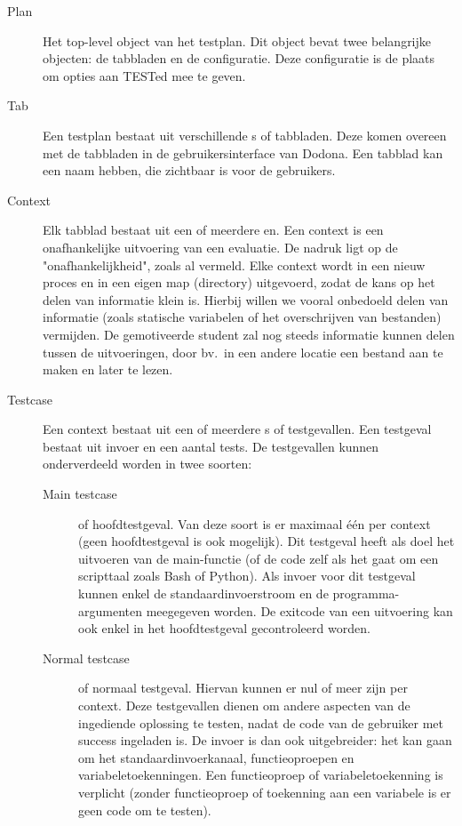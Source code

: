 \begin{description}
    \item[Plan] Het top-level object van het testplan.
    Dit object bevat twee belangrijke objecten: de tabbladen en de configuratie.
    Deze configuratie is de plaats om opties aan TESTed mee te geven.
    \item[Tab] Een testplan bestaat uit verschillende s of tabbladen.
    Deze komen overeen met de tabbladen in de gebruikersinterface van Dodona.
    Een tabblad kan een naam hebben, die zichtbaar is voor de gebruikers.
    \item[Context] Elk tabblad bestaat uit een of meerdere en.
    Een context is een onafhankelijke uitvoering van een evaluatie.
    De nadruk ligt op de "onafhankelijkheid", zoals al vermeld.
    Elke context wordt in een nieuw proces en in een eigen map (directory) uitgevoerd, zodat de kans op het delen van informatie klein is.
    Hierbij willen we vooral onbedoeld delen van informatie (zoals statische variabelen of het overschrijven van bestanden) vermijden.
    De gemotiveerde student zal nog steeds informatie kunnen delen tussen de uitvoeringen, door bv.\ in een andere locatie een bestand aan te maken en later te lezen.
    \item[Testcase] Een context bestaat uit een of meerdere s of testgevallen.
    Een testgeval bestaat uit invoer en een aantal tests.
    De testgevallen kunnen onderverdeeld worden in twee soorten:
    \begin{description}
        \item[Main testcase] of hoofdtestgeval.
        Van deze soort is er maximaal één per context (geen hoofdtestgeval is ook mogelijk).
        Dit testgeval heeft als doel het uitvoeren van de main-functie (of de code zelf als het gaat om een scripttaal zoals Bash of Python).
        Als invoer voor dit testgeval kunnen enkel de standaardinvoerstroom en de programma-argumenten meegegeven worden.
        De exitcode van een uitvoering kan ook enkel in het hoofdtestgeval gecontroleerd worden.
        \item[Normal testcase] of normaal testgeval.
        Hiervan kunnen er nul of meer zijn per context.
        Deze testgevallen dienen om andere aspecten van de ingediende oplossing te testen, nadat de code van de gebruiker met success ingeladen is.
        De invoer is dan ook uitgebreider: het kan gaan om het standaardinvoerkanaal, functieoproepen en variabeletoekenningen.
        Een functieoproep of variabeletoekenning is verplicht (zonder functieoproep of toekenning aan een variabele is er geen code om te testen).

\end{description}
\end{description}
